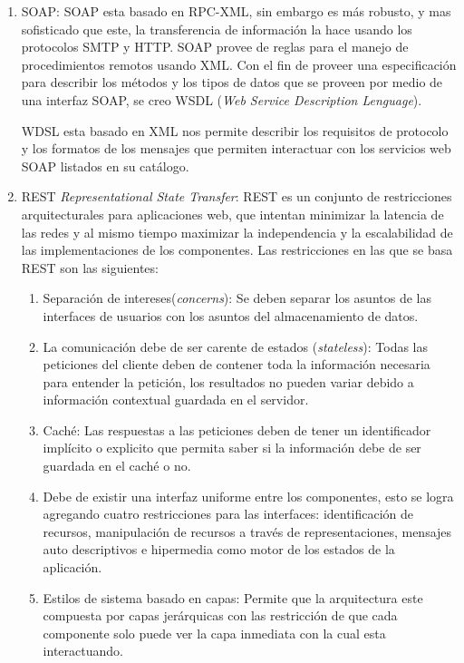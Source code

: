 \documentclass[12pt,a4paper,spanish,openany]{book}
\begin{document}
\begin{itemize}
\begin{enumerate}
  \item SOAP: SOAP esta basado en RPC-XML, sin embargo es más robusto, y mas
  sofisticado que este, la transferencia de información la hace usando los
  protocolos SMTP y HTTP. SOAP provee de reglas para el manejo de
  procedimientos remotos usando XML. Con el fin de proveer una especificación
  para describir los métodos y los tipos de datos que se proveen por medio de
  una interfaz SOAP, se creo WSDL (\emph{Web Service Description Lenguage}).
  
  WDSL esta basado en XML  nos permite describir los requisitos de
  protocolo y  los formatos de los mensajes que permiten interactuar con los
  servicios web SOAP listados en su catálogo.
  
  \item REST \emph{Representational State Transfer}:  REST es un conjunto de
  restricciones arquitecturales para aplicaciones web, que intentan minimizar
  la latencia de las redes y al mismo tiempo maximizar la independencia y la
  escalabilidad de las implementaciones de los componentes.
  Las restricciones en las que se basa REST son las siguientes:
  \begin{enumerate}
    \item Separación de intereses(\emph{concerns}): Se deben separar
    los asuntos de las interfaces de usuarios con los asuntos del
    almacenamiento de datos.
    
    \item La comunicación debe de ser carente de estados (\emph{stateless}):
    Todas las peticiones del cliente deben de contener toda la información
    necesaria para entender la petición, los resultados no pueden variar debido
    a información contextual guardada en el servidor.
    
    \item Caché: Las respuestas a las peticiones deben de tener un identificador
    implícito o explicito que permita saber si la información debe de ser
    guardada en el caché o no.
    
    \item Debe de existir una interfaz uniforme entre los componentes, esto se
    logra agregando cuatro restricciones para las interfaces:
    identificación de recursos, manipulación de recursos a través de
    representaciones, mensajes auto descriptivos e hipermedia como motor de los
    estados de la aplicación.
    
    \item Estilos de sistema basado en capas: Permite que la arquitectura este
    compuesta por capas jerárquicas con las restricción de que cada componente
    solo puede ver la capa inmediata con la cual esta interactuando.
    

\end{enumerate}
\end{enumerate}
\end{itemize}
\end{document}
